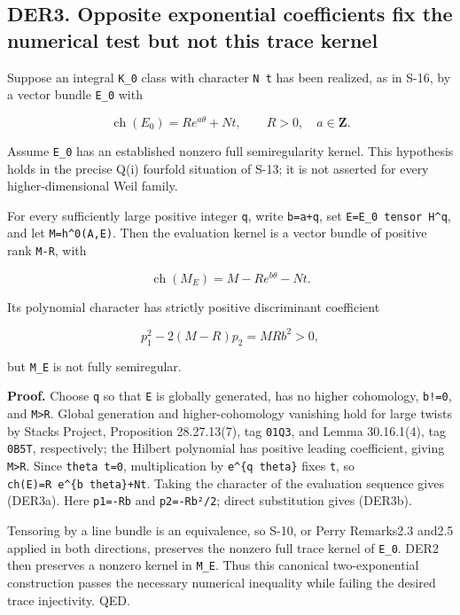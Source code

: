 \documentclass[11pt,a4paper]{article}
\theoremstyle{definition}
\begin{document}
\subsection{DER3. Opposite exponential coefficients fix the numerical
test but not this trace
kernel}\label{derived-candidates-der3.-opposite-exponential-coefficients-fix-the-numerical-test-but-not-this-trace-kernel}

Suppose an integral \texttt{K\_0} class with character \texttt{N\ t} has
been realized, as in S-16, by a vector bundle \texttt{E\_0} with

\[
 \operatorname{ch}(E_0)=R e^{a\theta}+N t,
 \qquad R>0,\quad a\in\mathbf Z.
\]

Assume \texttt{E\_0} has an established nonzero full semiregularity
kernel. This hypothesis holds in the precise Q(i) fourfold situation of
S-13; it is not asserted for every higher-dimensional Weil family.

For every sufficiently large positive integer \texttt{q}, write
\texttt{b=a+q}, set \texttt{E=E\_0\ tensor\ H\^{}q}, and let
\texttt{M=h\^{}0(A,E)}. Then the evaluation kernel is a vector bundle of
positive rank \texttt{M-R}, with

\[
 \operatorname{ch}(M_E)
 =M-R e^{b\theta}-N t.
\tag{DER3a}
\]

Its polynomial character has strictly positive discriminant coefficient

\[
 p_1^2-2(M-R)p_2=MRb^2>0,
\tag{DER3b}
\]

but \texttt{M\_E} is not fully semiregular.

\textbf{Proof.} Choose \texttt{q} so that \texttt{E} is globally
generated, has no higher cohomology, \texttt{b!=0}, and
\texttt{M\textgreater{}R}. Global generation and higher-cohomology
vanishing hold for large twists by Stacks Project, Proposition
28.27.13(7), tag \texttt{01Q3}, and Lemma 30.16.1(4), tag \texttt{0B5T},
respectively; the Hilbert polynomial has positive leading coefficient,
giving \texttt{M\textgreater{}R}. Since \texttt{theta\ t=0},
multiplication by \texttt{e\^{}\{q\ theta\}} fixes \texttt{t}, so
\texttt{ch(E)=R\ e\^{}\{b\ theta\}+Nt}. Taking the character of the
evaluation sequence gives (DER3a). Here \texttt{p1=-Rb} and
\texttt{p2=-Rb²/2}; direct substitution gives (DER3b).

Tensoring by a line bundle is an equivalence, so S-10, or Perry
Remarks2.3 and2.5 applied in both directions, preserves the nonzero full
trace kernel of \texttt{E\_0}. DER2 then preserves a nonzero kernel in
\texttt{M\_E}. Thus this canonical two-exponential construction passes
the necessary numerical inequality while failing the desired trace
injectivity. QED.
\end{document}
